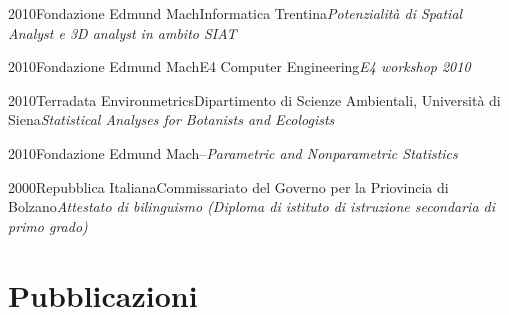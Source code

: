 \documentclass{curriculum}
\begin{document}
    \begin{entrylist}
    \entry
        {2010}{Fondazione Edmund Mach}{Informatica Trentina}{\emph{Potenzialità di Spatial Analyst e 3D analyst in ambito SIAT}}
    \end{entrylist} 
        
    \begin{entrylist}
    \entry
        {2010}{Fondazione Edmund Mach}{E4 Computer Engineering}{\emph{E4 workshop 2010}}
    \end{entrylist}
    
    \begin{entrylist}
    \entry
        {2010}{Terradata Environmetrics}{Dipartimento di Scienze Ambientali, Università di Siena}{\emph{Statistical Analyses for Botanists and Ecologists}}
    \end{entrylist}
    
    \begin{entrylist}
    \entry
        {2010}{Fondazione Edmund Mach}{--}{\emph{Parametric and Nonparametric Statistics}}
    \end{entrylist}
    
    \begin{entrylist}
    \entry
        {2000}{Repubblica Italiana}{Commissariato del Governo per la Priovincia di Bolzano}{\emph{Attestato di bilinguismo (Diploma di istituto di istruzione secondaria di primo grado)}}
    \end{entrylist}
    
    \section{Pubblicazioni}
    \vspace{-0.5 cm}
    \begin{refsection}
        \nocite{*}
        \newrefcontext[sorting=ydnt]
        \printbibliography[type=article, title={Riviste peer-review}, heading=subbibliography, notkeyword=divulgative]
    \end{refsection}
 
    \begin{refsection}
        \nocite{*}
        \newrefcontext[sorting=ydnt]
        \printbibliography[type=incollection, notkeyword=report, title={Capitoli di libro}, heading=subbibliography]
    \end{refsection}

    \begin{refsection}
        \nocite{*}
        \newrefcontext[sorting=ydnt]
        \printbibliography[type=inproceedings, title={Atti di convegno}, heading=subbibliography]
    \end{refsection}
    
\end{document}
